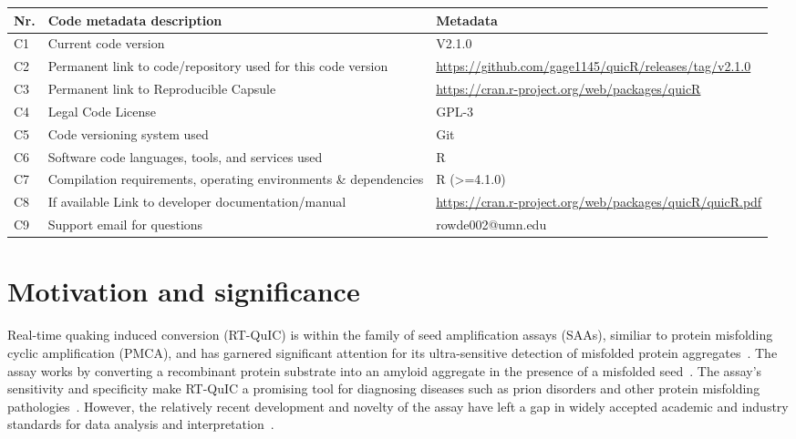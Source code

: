 \documentclass[preprint,12pt,a4paper]{elsarticle}
\begin{document}
    \begin{table}[ht]
        \fontsize{9pt}{9pt}\selectfont
        \centering
        \begin{tabular}{lp{6cm}p{6cm}}
            \hline
            \textbf{Nr.} & \textbf{Code metadata description} & \textbf{Metadata} \\
            \hline
            C1 & Current code version & V2.1.0 \\
            C2 & Permanent link to code/repository used for this code version & \url{https://github.com/gage1145/quicR/releases/tag/v2.1.0} \\
            C3  & Permanent link to Reproducible Capsule & \url{https://cran.r-project.org/web/packages/quicR}\\
            C4 & Legal Code License & GPL-3\\
            C5 & Code versioning system used & Git\\
            C6 & Software code languages, tools, and services used & R\\
            C7 & Compilation requirements, operating environments \& dependencies & R (>=4.1.0)\\
            C8 & If available Link to developer documentation/manual & \url{https://cran.r-project.org/web/packages/quicR/quicR.pdf}\\
            C9 & Support email for questions & rowde002@umn.edu\\
            \hline
        \end{tabular}
    \end{table}

    \section{Motivation and significance}
        Real-time quaking induced conversion (RT-QuIC) is within the family of seed amplification assays (SAAs), similiar to protein misfolding cyclic amplification (PMCA), and has garnered significant attention for its ultra-sensitive detection of misfolded protein aggregates~\cite{Wilham2010, Atarashi2011}. The assay works by converting a recombinant protein substrate into an amyloid aggregate in the presence of a misfolded seed~\cite{Wilham2010, Orru2012, Orru2017, Orru2015, Bongianni2019, Dassanayake2016, Hwang2018, Groveman2018, Metrick2020}. The assay's sensitivity and specificity make RT-QuIC a promising tool for diagnosing diseases such as prion disorders and other protein misfolding pathologies~\cite{Fiorini2020, Franceschini2017, Picasso-Risso2022, Holz2021}. However, the relatively recent development and novelty of the assay have left a gap in widely accepted academic and industry standards for data analysis and interpretation~\cite{Rowden2023}.
\end{document}
